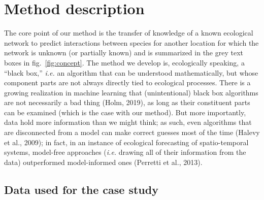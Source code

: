 \documentclass[11pt]{article}
\begin{document}
\hypertarget{method-description}{%
\section{Method description}\label{method-description}}

The core point of our method is the transfer of knowledge of a known
ecological network to predict interactions between species for another
location for which the network is unknown (or partially known) and is
summarized in the grey text boxes in fig.~\ref{fig:concept}. The method
we develop is, ecologically speaking, a ``black box,'' \emph{i.e.} an
algorithm that can be understood mathematically, but whose component
parts are not always directly tied to ecological processes. There is a
growing realization in machine learning that (unintentional) black box
algorithms are not necessarily a bad thing (Holm, 2019), as long as
their constituent parts can be examined (which is the case with our
method). But more importantly, data hold more information than we might
think; as such, even algorithms that are disconnected from a model can
make correct guesses most of the time (Halevy et al., 2009); in fact, in
an instance of ecological forecasting of spatio-temporal systems,
model-free approaches (\emph{i.e.} drawing all of their information from
the data) outperformed model-informed ones (Perretti et al., 2013).

\hypertarget{data-used-for-the-case-study}{%
\subsection{Data used for the case
study}\label{data-used-for-the-case-study}}
\end{document}
